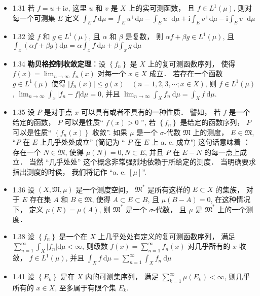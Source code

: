 \begin{itemize}
\item 1.31 若 $f=u+\mathrm{i} v$, 这里 $u$ 和 $v$ 是 $X$ 上的实可测函数， 且 $f \in L^{1}(\mu)$, 则对每一个可测集 $E$ 定义 $\int_{E} f \mathrm{~d} \mu=\int_{E} u^{+} \mathrm{d} \mu-\int_{E} u^{-} \mathrm{d} \mu+\mathrm{i} \int_{E} v^{+} \mathrm{d} \mu-\mathrm{i} \int_{E} v^{-} \mathrm{d} \mu$

\item 1.32 设 $f$ 和 $g \in L^{1}(\mu)$, 且 $\alpha$ 和 $\beta$ 是复数， 则 $\alpha f+\beta g \in L^{1}(\mu)$, 且 $\int_{x}(\alpha f+\beta g) \mathrm{d} \mu=\alpha \int_{x} f \mathrm{~d} \mu+\beta \int_{x} g \mathrm{~d} \mu$

\item 1.34 \textbf{勒贝格控制收敛定理}：设 $\left\{f_{n}\right\}$ 是 $X$ 上的复可测函数序列， 使得 $f(x)=\lim _{n \rightarrow \infty} f_{n}(x)$ 对每一个 $x \in X$ 成立． 若存在一个函数 $g \in L^{1}(\mu)$ 使得 $\left|f_{n}(x)\right| \leqslant g(x) \quad(n=1,2,3, \cdots ; x \in X)$, 则 $f \in L^{1}(\mu)$, $\lim _{n \rightarrow \infty} \int_{x}\left|f_{n}-f\right| \mathrm{d} \mu=0$, 并且 $\lim _{n \rightarrow \infty} \int_{X} f_{n} \mathrm{~d} \mu=\int_{X} f \mathrm{~d} \mu$.

\item 1.35 设 $P$ 是对于点 $x$ 可以具有或者不具有的一种性质． 譬如， 若 $f$ 是一个给定的函数， $P$ 可以是性质“ $f(x)>0$ ”, 若 $\left\{f_{n}\right\}$ 是给定的函数序列， $P$ 可以是性质“ $\left\{f_{n}(x)\right\}$ 收敛”. 如果 $\mu$ 是一个 $\sigma$-代数 $\mathfrak{M}$ 上的测度， $E \in \mathfrak{M}$, “$P$ 在 $E$ 上几乎处处成立” (简记为 “ $P$ 在 $E$ 上 a. e. 成立") 这句话意味着 ： 存在一个 $N \in \mathfrak{M}$, 使得 $\mu(N)=0, N \subset E$, 并且 $P$ 在 $E-N$ 的每一点上成立． 当然 “几乎处处” 这个概念非常强烈地依赖于所给定的测度． 当明确要求指出测度的时侯， 我们将记作 “a. e. $[\mu]$”.

\item 1.36 设 $(X, \mathfrak{M}, \mu)$ 是一个测度空间， $\mathfrak{M}^*$  是所有这样的 $E \subset X$ 的集族， 对于 $E$ 存在集 $A$ 和 $B \in \mathfrak{M}$, 使得 $A \subset E \subset B$, 且 $\mu(B-A)=0$, 在这种情况下， 定义 $\mu(E)=\mu(A)$, 则 $\mathfrak{M}^{*}$ 是一个 $\sigma$-代数， 且 $\mu$ 是 $\mathfrak{M}^{*}$ 上的一个测度．

\item 1.38 设 $\left\{f_{n}\right\}$ 是一个在 $X$ 上几乎处处有定义的复可测函数序列， 满足 $\sum_{n=1}^{\infty} \int_{X}\left|f_{n}\right| \mathrm{d} \mu<\infty$, 则级数 $f(x)=\sum_{n=1}^{\infty} f_{n}(x)$ 对几乎所有的 $x$ 收敛， $f \in L^{1}(\mu)$, 并且 $\int_{X} f \mathrm{~d} \mu=\sum_{n=1}^{\infty} \int_{X} f_{n} \mathrm{~d} \mu$

\item 1.41 设 $\left\{E_{k}\right\}$ 是在 $X$ 内的可测集序列， 满足 $\sum_{k=1}^{\infty} \mu\left(E_{k}\right)<\infty$, 则几乎所有的 $x \in X$, 至多属于有限个集 $E_{k}$.
\end{itemize}


